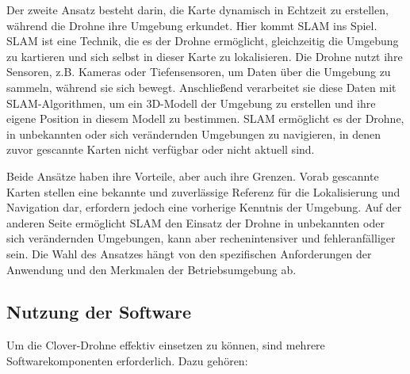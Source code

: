 Der zweite Ansatz besteht darin, die Karte dynamisch in Echtzeit zu erstellen, während die Drohne ihre Umgebung erkundet. Hier kommt \ac{SLAM} ins Spiel. \ac{SLAM} ist eine Technik, die es der Drohne ermöglicht, gleichzeitig die Umgebung zu kartieren und sich selbst in dieser Karte zu lokalisieren. Die Drohne nutzt ihre Sensoren, z.B. Kameras oder Tiefensensoren, um Daten über die Umgebung zu sammeln, während sie sich bewegt. Anschließend verarbeitet sie diese Daten mit \ac{SLAM}-Algorithmen, um ein 3D-Modell der Umgebung zu erstellen und ihre eigene Position in diesem Modell zu bestimmen. \ac{SLAM} ermöglicht es der Drohne, in unbekannten oder sich verändernden Umgebungen zu navigieren, in denen zuvor gescannte Karten nicht verfügbar oder nicht aktuell sind.

Beide Ansätze haben ihre Vorteile, aber auch ihre Grenzen. Vorab gescannte Karten stellen eine bekannte und zuverlässige Referenz für die Lokalisierung und Navigation dar, erfordern jedoch eine vorherige Kenntnis der Umgebung. Auf der anderen Seite ermöglicht \ac{SLAM} den Einsatz der Drohne in unbekannten oder sich verändernden Umgebungen, kann aber rechenintensiver und fehleranfälliger sein. Die Wahl des Ansatzes hängt von den spezifischen Anforderungen der Anwendung und den Merkmalen der Betriebsumgebung ab.



\subsection{Nutzung der Software} \label{nutzung_der_software:subsection}

Um die Clover-Drohne effektiv einsetzen zu können, sind mehrere Softwarekomponenten erforderlich. Dazu gehören:

